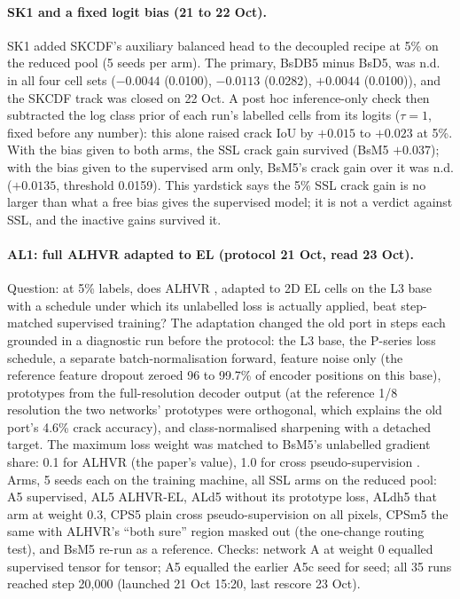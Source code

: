 \paragraph{SK1 and a fixed logit bias (21 to 22 Oct).} SK1 added SKCDF's auxiliary balanced head to the decoupled recipe at 5\% on
the reduced pool (5 seeds per arm). The primary, BsDB5 minus BsD5, was n.d. in all four cell sets ($-0.0044$ (0.0100), $-0.0113$
(0.0282), $+0.0044$ (0.0100)), and the SKCDF track was closed on 22 Oct. A post hoc inference-only check then subtracted the log class
prior of each run's labelled cells from its logits ($\tau = 1$, fixed before any number): this alone raised crack IoU by $+0.015$ to
$+0.023$ at 5\%. With the bias given to both arms, the SSL crack gain survived (BsM5 $+0.037$); with the bias given to the supervised
arm only, BsM5's crack gain over it was n.d. ($+0.0135$, threshold 0.0159). This yardstick says the 5\% SSL crack gain is no larger
than what a free bias gives the supervised model; it is not a verdict against SSL, and the inactive gains survived it.

\paragraph{AL1: full ALHVR adapted to EL (protocol 21 Oct, read 23 Oct).} Question: at 5\% labels, does ALHVR \citep{lei2025alhvr},
adapted to 2D EL cells on the L3 base with a schedule under which its unlabelled loss is actually applied, beat step-matched
supervised training? The adaptation changed the old port in steps each grounded in a diagnostic run before the protocol: the L3 base,
the P-series loss schedule, a separate batch-normalisation forward, feature noise only (the reference feature dropout zeroed 96 to
99.7\% of encoder positions on this base), prototypes from the full-resolution decoder output (at the reference 1/8 resolution the two
networks' prototypes were orthogonal, which explains the old port's 4.6\% crack accuracy), and class-normalised sharpening with a
detached target. The maximum loss weight was matched to BsM5's unlabelled gradient share: 0.1 for ALHVR (the paper's value), 1.0 for
cross pseudo-supervision \citep{chen2021cps}. Arms, 5 seeds each on the training machine, all
SSL arms on the reduced pool: A5 supervised, AL5 ALHVR-EL, ALd5 without its prototype loss, ALdh5 that arm at weight 0.3, CPS5 plain
cross pseudo-supervision on all pixels, CPSm5 the same with ALHVR's ``both sure'' region masked out (the one-change routing test), and
BsM5 re-run as a reference. Checks: network A at weight 0 equalled supervised tensor for tensor; A5 equalled the earlier A5c seed for
seed; all 35 runs reached step 20,000 (launched 21 Oct 15:20, last rescore 23 Oct).

